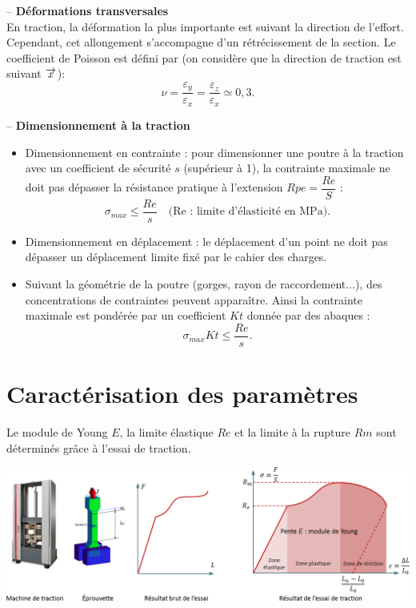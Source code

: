\documentclass[10pt,fleqn]{article} %
\begin{document}
\begin{resultat} -- \textbf{Déformations transversales} ~\\
En traction, la déformation la plus importante est suivant la direction de l'effort. Cependant, cet allongement s'accompagne d'un rétrécissement de la section. Le coefficient de Poisson est défini par (on considère que la direction de traction est suivant $\overrightarrow{x}$): 
$$
\nu = \dfrac{\varepsilon_y}{\varepsilon_x} = \dfrac{\varepsilon_z}{\varepsilon_x} \simeq 0,3.
$$

\end{resultat}


\begin{resultat} -- \textbf{Dimensionnement à la traction} ~\\
\begin{itemize}
\item Dimensionnement en contrainte : pour dimensionner une poutre à la traction avec un coefficient de sécurité $s$ (supérieur à 1), la contrainte maximale ne doit pas dépasser la résistance pratique à l'extension $Rpe = \dfrac{Re}{S}$ :
$$
\sigma_{max} \leq \dfrac{Re}{s} \quad \text{(Re : limite d'élasticité en MPa)}.
$$ 
\item Dimensionnement en déplacement : le déplacement d'un point ne doit pas dépasser un déplacement limite fixé par le cahier des charges.

\item Suivant la géométrie de la poutre (gorges, rayon de raccordement...), des concentrations de contraintes peuvent apparaître. Ainsi la contrainte maximale est pondérée par un coefficient $Kt$ donnée par des abaques : 
$$
\sigma_{max} Kt \leq \dfrac{Re}{s}.
$$ 
\end{itemize}
\end{resultat}


\section{Caractérisation des paramètres}
Le module de Young $E$, la limite élastique $Re$ et la limite à la rupture $Rm$ sont déterminés grâce à l'essai de traction. 
\begin{center}
\includegraphics[width=\linewidth]{images/essai_traction}
\end{center}
\end{document}
